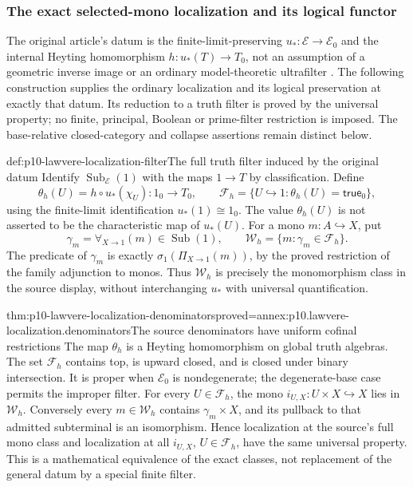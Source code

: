 \subsubsection{The exact selected-mono localization and its logical functor}
\label{sec:p10-lawvere-localization}

The original article's datum is the finite-limit-preserving
\(u_*:\mathcal E\to\mathcal E_0\) and the internal Heyting
homomorphism \(h:u_*(T)\to T_0\), not an assumption of a
geometric inverse image or an ordinary model-theoretic ultrafilter
\cite[p.~332]{Lawvere1970}.  The following construction supplies
the ordinary localization and its logical preservation at exactly
that datum.  Its reduction to a truth filter is proved by the
universal property; no finite, principal, Boolean or prime-filter
restriction is imposed.  The base-relative closed-category and
collapse assertions remain distinct below.

\begin{hbdefinition}{def:p10-lawvere-localization-filter}{The full truth filter induced by the original datum}
Identify \(\operatorname{Sub}_{\mathcal E}(1)\) with the
maps \(1\to T\) by classification.  Define
\[
 \theta_h(U)=h\circ u_*(\chi_U):1_0\longrightarrow T_0,
 \qquad
 \mathcal F_h=\{U\hookrightarrow1:\theta_h(U)=\mathsf{true}_0\},
\]
using the finite-limit identification \(u_*(1)\cong1_0\).
The value \(\theta_h(U)\) is not asserted to be the
characteristic map of \(u_*(U)\).  For a mono
\(m:A\hookrightarrow X\), put
\[
         \gamma_m=\forall_{X\to1}(m)\in\operatorname{Sub}(1),
 \qquad \mathcal W_h=\{m:\gamma_m\in\mathcal F_h\}.
\]
The predicate of \(\gamma_m\) is exactly
\(\sigma_1(\Pi_{X\to1}(m))\), by the proved restriction
of the family adjunction to monos.  Thus \(\mathcal W_h\)
is precisely the monomorphism class in the source display,
without interchanging \(u_*\) with universal quantification.
\end{hbdefinition}

\begin{hblemma}{thm:p10-lawvere-localization-denominators}{proved=annex:p10.lawvere-localization.denominators}{The source denominators have uniform cofinal restrictions}
The map \(\theta_h\) is a Heyting homomorphism on global
truth algebras.  The set \(\mathcal F_h\) contains top,
is upward closed, and is closed under binary intersection.
It is proper when \(\mathcal E_0\) is nondegenerate;
the degenerate-base case permits the improper filter.
For every \(U\in\mathcal F_h\), the mono
\(i_{U,X}:U\times X\hookrightarrow X\) lies in
\(\mathcal W_h\).  Conversely every \(m\in\mathcal W_h\)
contains \(\gamma_m\times X\), and its pullback to
that admitted subterminal is an isomorphism.
Hence localization at the source's full mono class and
localization at all \(i_{U,X}\), \(U\in\mathcal F_h\),
have the same universal property.  This is a mathematical
equivalence of the exact classes, not replacement of the
general datum by a special finite filter.
\end{hblemma}

